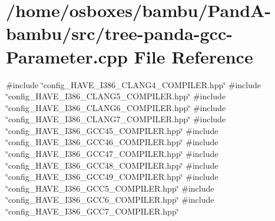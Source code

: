 \hypertarget{tree-panda-gcc-Parameter_8cpp}{}\section{/home/osboxes/bambu/\+Pand\+A-\/bambu/src/tree-\/panda-\/gcc-\/\+Parameter.cpp File Reference}
\label{tree-panda-gcc-Parameter_8cpp}
{\ttfamily \#include \char`\"{}config\+\_\+\+H\+A\+V\+E\+\_\+\+I386\+\_\+\+C\+L\+A\+N\+G4\+\_\+\+C\+O\+M\+P\+I\+L\+E\+R.\+hpp\char`\"{}}\newline
{\ttfamily \#include \char`\"{}config\+\_\+\+H\+A\+V\+E\+\_\+\+I386\+\_\+\+C\+L\+A\+N\+G5\+\_\+\+C\+O\+M\+P\+I\+L\+E\+R.\+hpp\char`\"{}}\newline
{\ttfamily \#include \char`\"{}config\+\_\+\+H\+A\+V\+E\+\_\+\+I386\+\_\+\+C\+L\+A\+N\+G6\+\_\+\+C\+O\+M\+P\+I\+L\+E\+R.\+hpp\char`\"{}}\newline
{\ttfamily \#include \char`\"{}config\+\_\+\+H\+A\+V\+E\+\_\+\+I386\+\_\+\+C\+L\+A\+N\+G7\+\_\+\+C\+O\+M\+P\+I\+L\+E\+R.\+hpp\char`\"{}}\newline
{\ttfamily \#include \char`\"{}config\+\_\+\+H\+A\+V\+E\+\_\+\+I386\+\_\+\+G\+C\+C45\+\_\+\+C\+O\+M\+P\+I\+L\+E\+R.\+hpp\char`\"{}}\newline
{\ttfamily \#include \char`\"{}config\+\_\+\+H\+A\+V\+E\+\_\+\+I386\+\_\+\+G\+C\+C46\+\_\+\+C\+O\+M\+P\+I\+L\+E\+R.\+hpp\char`\"{}}\newline
{\ttfamily \#include \char`\"{}config\+\_\+\+H\+A\+V\+E\+\_\+\+I386\+\_\+\+G\+C\+C47\+\_\+\+C\+O\+M\+P\+I\+L\+E\+R.\+hpp\char`\"{}}\newline
{\ttfamily \#include \char`\"{}config\+\_\+\+H\+A\+V\+E\+\_\+\+I386\+\_\+\+G\+C\+C48\+\_\+\+C\+O\+M\+P\+I\+L\+E\+R.\+hpp\char`\"{}}\newline
{\ttfamily \#include \char`\"{}config\+\_\+\+H\+A\+V\+E\+\_\+\+I386\+\_\+\+G\+C\+C49\+\_\+\+C\+O\+M\+P\+I\+L\+E\+R.\+hpp\char`\"{}}\newline
{\ttfamily \#include \char`\"{}config\+\_\+\+H\+A\+V\+E\+\_\+\+I386\+\_\+\+G\+C\+C5\+\_\+\+C\+O\+M\+P\+I\+L\+E\+R.\+hpp\char`\"{}}\newline
{\ttfamily \#include \char`\"{}config\+\_\+\+H\+A\+V\+E\+\_\+\+I386\+\_\+\+G\+C\+C6\+\_\+\+C\+O\+M\+P\+I\+L\+E\+R.\+hpp\char`\"{}}\newline
{\ttfamily \#include \char`\"{}config\+\_\+\+H\+A\+V\+E\+\_\+\+I386\+\_\+\+G\+C\+C7\+\_\+\+C\+O\+M\+P\+I\+L\+E\+R.\+hpp\char`\"{}}\newline
